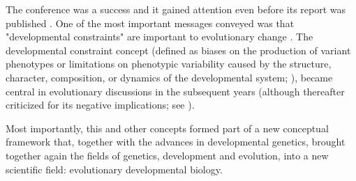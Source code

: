 The conference was a success and it gained attention even before its report was published \citep{Lewin1981}. 
%
One of the most important messages conveyed was that "developmental constraints" are important to evolutionary change \citep{Alberch1982}. 
%
The developmental constraint concept (defined as biases on the production of variant phenotypes or limitations on phenotypic variability caused by the structure, character, composition, or dynamics of the developmental system; \citealp{MaynardSmith1985}), 
became central in evolutionary discussions in the subsequent years \citep{love2014conceptual} (although thereafter criticized for its negative implications; see \citealp{Salazar-Ciudad2006,love2014conceptual}).


Most importantly, this and other concepts formed part of a new conceptual framework \citep{love2014conceptual} that, together with the advances in developmental genetics, brought together again the fields of genetics, development and evolution, into a new scientific field: evolutionary developmental biology.







